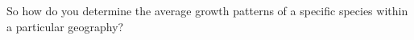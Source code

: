 So how do you determine the average growth patterns of a specific species within a particular geography?